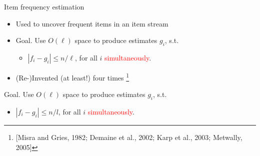 \documentclass[first=dgreen,second=purple,logo=redque]{aaltoslides}
\begin{document}
\begin{frame}[allowframebreaks=1]{Item frequency estimation}
\begin{itemize}
    \item Used to uncover \textcolor{dgreen}{frequent} items in an item stream
    \item \textcolor{dgreen}{Goal.} Use $O(\ell)$ space to produce estimates $g_{i}$, s.t.
		\begin{itemize}
			\item{$|f_{i} - g_{i} | \leq n/\ell$}, for all $i$ \textcolor{red}{simultaneously}.
		\end{itemize}

    \item (Re-)Invented (at least!) four times \cite{Misra82, Demaine02, Karp03, Metwally05}\footnote{[Misra and Gries, 1982; Demaine et al., 2002; Karp et al., 2003; Metwally, 2005]}
\end{itemize}

\textcolor{dgreen}{Goal.} Use $O(\ell)$ space to produce estimates $g_{i}$, s.t.
\begin{itemize}
	\item{$|f_{i} - g_{i} | \leq n/l$}, for all $i$ \textcolor{red}{simultaneously}.
\end{itemize}

\end{frame}
\end{document}
